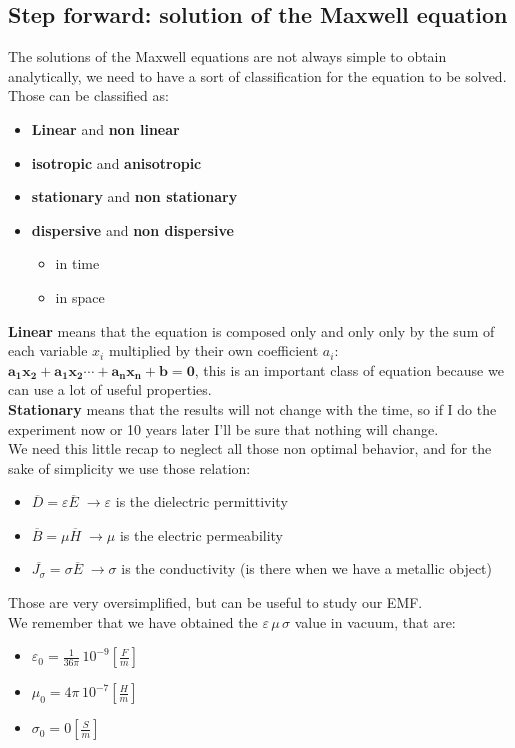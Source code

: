 \subsection*{Step forward: solution of the Maxwell equation}
The solutions of the Maxwell equations are not always simple to obtain analytically, we need to have a sort of classification for the equation to be solved. Those can be classified as:
\begin{itemize}
\item \textbf{Linear} and \textbf{non linear}
\item \textbf{isotropic} and \textbf{anisotropic}
\item \textbf{stationary} and \textbf{non stationary}
\item \textbf{dispersive} and \textbf{non dispersive}
\begin{itemize}
\item in time
\item in space
\end{itemize}
\end{itemize}
\textbf{Linear} means that the equation is composed only and only only by the sum of each variable $x_i$ multiplied by their own coefficient $a_i$: $\bm{a_1x_2+a_1x_2\cdots + a_nx_n+b=0}$, this is an important class of equation because we can use a lot of useful properties.\\
\textbf{Stationary} means that the results will not change with the time, so if I do the experiment now or 10 years later I'll be sure that nothing will change.\\
We need this little recap to neglect all those non optimal behavior, and for the sake of simplicity we use those relation:
\begin{itemize}
    \item $\overline{D}=\varepsilon \overline{E}\;\rightarrow \varepsilon$ is the dielectric permittivity
    \item $\overline{B}=\mu \overline{H}\;\rightarrow \mu$ is the electric permeability
    \item $\overline{J_\sigma}=\sigma \overline{E}\;\rightarrow \sigma$ is the conductivity (is there when we have a metallic object)
\end{itemize}
Those are very oversimplified, but can be useful to study our EMF.\\
We remember that we have obtained the $\varepsilon \, \mu \, \sigma$ value in vacuum, that are:
\begin{itemize}
    \item $\varepsilon_0=\frac{1}{36\pi}\,10^{-9} \left[\frac{F}{m}\right]$
    \item $\mu_0=4\pi\,10^{-7} \left[\frac{H}{m}\right]$
    \item $\sigma_0=0 \left[\frac{S}{m}\right]$
\end{itemize}
